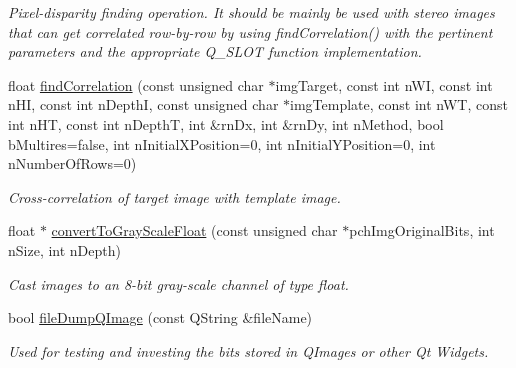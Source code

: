 \begin{DoxyCompactItemize}
\begin{DoxyCompactList}\small\item\em Pixel-\/disparity finding operation. It should be mainly be used with stereo images that can get correlated row-\/by-\/row by using findCorrelation() with the pertinent parameters and the appropriate Q\_\-SLOT function implementation. \item\end{DoxyCompactList}\item 
float \hyperlink{classQcorr_a05dcc1b0be4596b355df235264180da4}{findCorrelation} (const unsigned char $\ast$imgTarget, const int nWI, const int nHI, const int nDepthI, const unsigned char $\ast$imgTemplate, const int nWT, const int nHT, const int nDepthT, int \&rnDx, int \&rnDy, int nMethod, bool bMultires=false, int nInitialXPosition=0, int nInitialYPosition=0, int nNumberOfRows=0)
\begin{DoxyCompactList}\small\item\em Cross-\/correlation of target image with template image. \item\end{DoxyCompactList}\item 
float $\ast$ \hyperlink{classQcorr_a0f203c8a83cd1e6b503aee0a4c873402}{convertToGrayScaleFloat} (const unsigned char $\ast$pchImgOriginalBits, int nSize, int nDepth)
\begin{DoxyCompactList}\small\item\em Cast images to an 8-\/bit gray-\/scale channel of type float. \item\end{DoxyCompactList}\item 
bool \hyperlink{classQcorr_a87229fc918fa4011e96fbadb325fd52e}{fileDumpQImage} (const QString \&fileName)
\begin{DoxyCompactList}\small\item\em Used for testing and investing the bits stored in QImages or other Qt Widgets. \item\end{DoxyCompactList}\end{DoxyCompactItemize}
